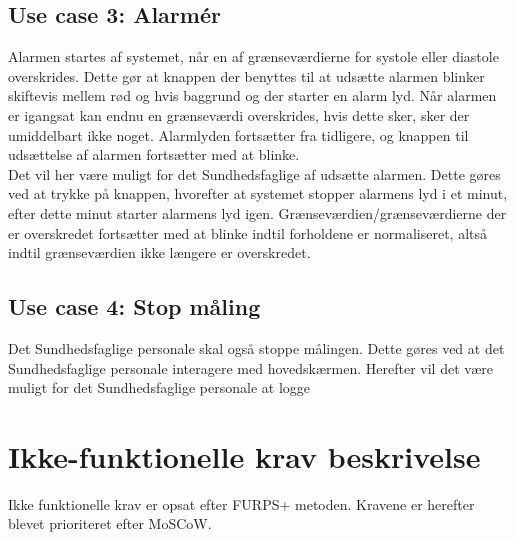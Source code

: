 \subsection{Use case 3: Alarmér}
Alarmen startes af systemet, når en af grænseværdierne for systole eller diastole overskrides. Dette gør at knappen der benyttes til at udsætte alarmen blinker skiftevis mellem rød og hvis baggrund og der starter en alarm lyd. Når alarmen er igangsat kan endnu en grænseværdi overskrides, hvis dette sker, sker der umiddelbart ikke noget. Alarmlyden fortsætter fra tidligere, og knappen til udsættelse af alarmen fortsætter med at blinke. \\
Det vil her være muligt for det Sundhedsfaglige af udsætte alarmen. Dette gøres ved at trykke på knappen, hvorefter at systemet stopper alarmens lyd i et minut, efter dette minut starter alarmens lyd igen. Grænseværdien/grænseværdierne der er overskredet fortsætter med at blinke indtil forholdene er normaliseret, altså indtil grænseværdien ikke længere er overskredet.
\subsection{Use case 4: Stop måling}
Det Sundhedsfaglige personale skal også stoppe målingen. Dette gøres ved at det Sundhedsfaglige personale interagere med hovedskærmen. Herefter vil det være muligt for det Sundhedsfaglige personale at logge 
\section{Ikke-funktionelle krav beskrivelse}
Ikke funktionelle krav er opsat efter FURPS+ metoden. Kravene er herefter blevet prioriteret efter MoSCoW.
